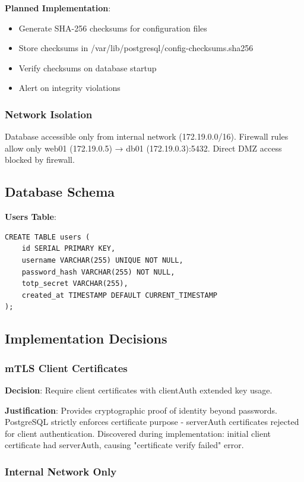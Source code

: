 \textbf{Planned Implementation}:
\begin{itemize}
    \item Generate SHA-256 checksums for configuration files
    \item Store checksums in /var/lib/postgresql/config-checksums.sha256
    \item Verify checksums on database startup
    \item Alert on integrity violations
\end{itemize}

\subsubsection{Network Isolation}

Database accessible only from internal network (172.19.0.0/16). Firewall rules allow only web01 (172.19.0.5) → db01 (172.19.0.3):5432. Direct DMZ access blocked by firewall.

\subsection{Database Schema}

\textbf{Users Table}:
\begin{verbatim}
CREATE TABLE users (
    id SERIAL PRIMARY KEY,
    username VARCHAR(255) UNIQUE NOT NULL,
    password_hash VARCHAR(255) NOT NULL,
    totp_secret VARCHAR(255),
    created_at TIMESTAMP DEFAULT CURRENT_TIMESTAMP
);
\end{verbatim}

\subsection{Implementation Decisions}

\subsubsection{mTLS Client Certificates}

\textbf{Decision}: Require client certificates with clientAuth extended key usage.

\textbf{Justification}: Provides cryptographic proof of identity beyond passwords. PostgreSQL strictly enforces certificate purpose - serverAuth certificates rejected for client authentication. Discovered during implementation: initial client certificate had serverAuth, causing "certificate verify failed" error.

\subsubsection{Internal Network Only}


